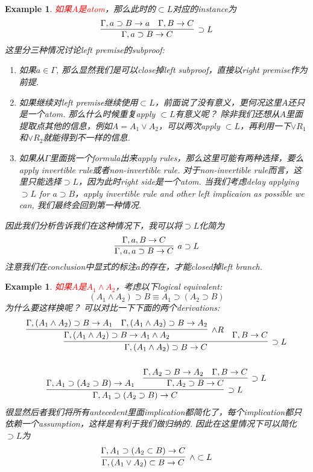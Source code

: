 \documentclass{article}
\theoremstyle{plain}
\newtheorem{example}[theorem]{Example}
\theoremstyle{nonumberplain}
\newcommand{\redt}[1]{\textcolor{red}{#1}}
\begin{document}
\begin{example}
\rm \redt{如果$A$是atom}，那么此时的$\subset L$对应的instance为
$$
\infer[\supset L]{\Gamma, a \supset B \to C}{\Gamma, a \supset B \to a & \Gamma, B \to C}
$$
这里分三种情况讨论left premise的subproof:
\begin{enumerate}
	\item 如果$a \in \Gamma$, 那么显然我们是可以close掉left subproof，直接以right premise作为前提. 
	\item 如果继续对left premise继续使用$\subset L$，前面说了没有意义，更何况这里$A$还只是一个atom.  那么什么时候重复apply $\subset L$有意义呢？ 除非我们还想从$A$里面提取点其他的信息，例如$A = A_1 \vee A_2$，可以两次apply $\subset L$，再利用一下$\vee R_1$和$\vee R_2$就能得到不一样的信息.
	\item 如果从$\Gamma$里面挑一个formula出来apply rules，那么这里可能有两种选择，要么apply invertible rule或者non-invertible rule. 对于non-invertible rule而言，这里只能选择$\supset L$，因为此时right side是一个atom. 当我们考虑delay applying $\supset L$ for $a \supset B$，apply invertible rule and other left implicaion as possible we can, 我们最终会回到第一种情况. 
\end{enumerate}
因此我们分析告诉我们在这种情况下，我可以将$\supset L$化简为
$$
\infer[a \supset L]{\Gamma,a,a \supset B \to C}{\Gamma,a, B \to C}
$$
注意我们在conclusion中显式的标注$a$的存在，才能closed掉left branch. 
\end{example}


\begin{example}
\rm \redt{如果$A$是$A_1 \wedge A_2$}，考虑以下logical equivalent:
$$
(A_1 \wedge A_2) \supset B \equiv A_1 \supset (A_2 \supset B)
$$
为什么要这样换呢？ 可以对比一下下面的两个derivations:
$$
\begin{gathered}
\infer[\supset L]{\Gamma, (A_1 \wedge A_2) \supset B \to C}{\infer[\wedge R]{\Gamma, (A_1 \wedge A_2) \supset B \to A_1 \wedge A_2}{\Gamma, (A_1 \wedge A_2) \supset B \to A_1  & \Gamma, (A_1 \wedge A_2) \supset B \to  A_2} & \Gamma, B \to C} \\\\
\infer[\supset L]{\Gamma,A_1 \supset (A_2 \supset B) \to C}{\Gamma,A_1 \supset (A_2 \supset B) \to A_1 & \infer[\supset L]{\Gamma,A_2 \supset B \to C}{\Gamma, A_2 \supset B \to A_2 &  \Gamma, B \to C}}
\end{gathered}
$$
很显然后者我们将所有antecedent里面implication都简化了，每个implication都只依赖一个assumption，这样是有利于我们做归纳的. 因此在这里情况下可以简化$\supset L$为
$$
\infer[\wedge \subset L]{\Gamma, (A_1 \vee A_2) \subset B \to C}{\Gamma, A_1 \supset (A_2 \subset B) \to C}
$$
\end{example}
\end{document}
